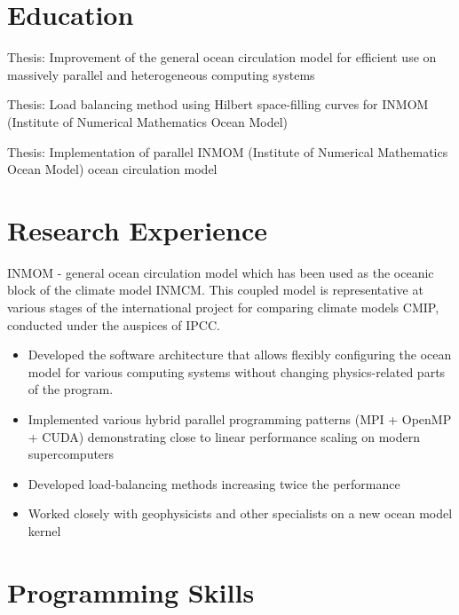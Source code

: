 \documentclass[10pt,a4paper]{moderncv}
\begin{document}
\section{Education}

{Thesis: Improvement of the general ocean circulation model for efficient use on massively parallel and heterogeneous computing systems}

{Thesis: Load balancing method using Hilbert space-filling curves for INMOM
(Institute of Numerical Mathematics Ocean Model)}

{Thesis: Implementation of parallel INMOM (Institute of Numerical Mathematics Ocean Model) ocean circulation model}

\section{Research Experience}

{INMOM - general ocean circulation model which has been used as the oceanic block of the climate model INMCM. This coupled model is representative at various stages of the international project for comparing climate models CMIP, conducted under the auspices of IPCC.
  \begin{itemize}
  \item Developed the software architecture that allows flexibly configuring the ocean model for various computing systems without changing physics-related parts of the program.
  \item Implemented various hybrid parallel programming patterns (MPI + OpenMP + CUDA) demonstrating close to linear performance scaling on modern supercomputers
  \item Developed load-balancing methods increasing twice the performance
  \item Worked closely with geophysicists and other specialists on a new ocean model kernel
  \end{itemize}
}

\section{Programming Skills}
\end{document}
